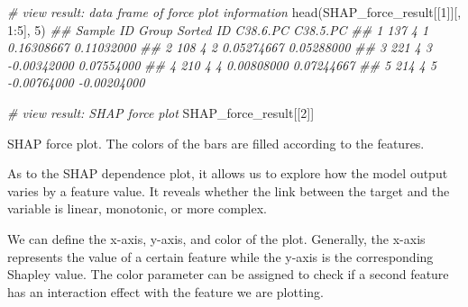 \documentclass[]{article}
\newcommand{\hlnum}[1]{\textcolor[rgb]{0.816,0.125,0.439}{#1}}%
\newcommand{\hlcom}[1]{\textcolor[rgb]{0.502,0.502,0.502}{\textit{#1}}}%
\newcommand{\hlopt}[1]{\textcolor[rgb]{0,0,0}{#1}}%
\newcommand{\hlstd}[1]{\textcolor[rgb]{0.251,0.251,0.251}{#1}}%
\newcommand{\hlkwd}[1]{\textcolor[rgb]{0.878,0.439,0.125}{#1}}%
\newenvironment{Shaded}{\begin{myshaded}}{\end{myshaded}}
\newcommand{\KeywordTok}[1]{\hlkwd{#1}}
\newcommand{\DecValTok}[1]{\hlnum{#1}}
\newcommand{\CommentTok}[1]{\hlcom{#1}}
\newcommand{\OperatorTok}[1]{\hlopt{#1}}
\newcommand{\NormalTok}[1]{\hlstd{#1}}
\begin{document}
\begin{Shaded}
\begin{Highlighting}[]
\CommentTok{# view result: data frame of force plot information}
\KeywordTok{head}\NormalTok{(SHAP_force_result[[}\DecValTok{1}\NormalTok{]][, }\DecValTok{1}\OperatorTok{:}\DecValTok{5}\NormalTok{], }\DecValTok{5}\NormalTok{)}
\CommentTok{##   Sample ID Group Sorted ID    C38.6.PC    C38.5.PC}
\CommentTok{## 1       137     4         1  0.16308667  0.11032000}
\CommentTok{## 2       108     4         2  0.05274667  0.05288000}
\CommentTok{## 3       221     4         3 -0.00342000  0.07554000}
\CommentTok{## 4       210     4         4  0.00808000  0.07244667}
\CommentTok{## 5       214     4         5 -0.00764000 -0.00204000}
\end{Highlighting}
\end{Shaded}

\begin{Shaded}
\begin{Highlighting}[]
\CommentTok{# view result: SHAP force plot}
\NormalTok{SHAP_force_result[[}\DecValTok{2}\NormalTok{]] }
\end{Highlighting}
\end{Shaded}

\label{fig:unnamed-chunk-67}SHAP force plot. The colors of the bars are filled according to the features.

As to the SHAP dependence plot, it allows us to explore how the model output varies by a feature value. It reveals whether the link between the target and the variable is linear, monotonic, or more complex.

We can define the x-axis, y-axis, and color of the plot. Generally, the x-axis represents the value of a certain feature while the y-axis is the corresponding Shapley value. The color parameter can be assigned to check if a second feature has an interaction effect with the feature we are plotting.
\end{document}
